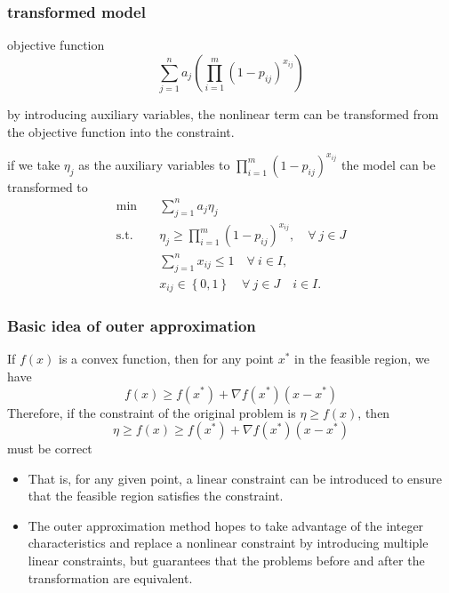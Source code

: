 \documentclass[CJK,10pt]{beamer}
\begin{document}
\begin{frame}
    \frametitle{transformed model}
    objective function
    \begin{equation*}
        \sum_{j=1}^n a_j \left( \prod_{i=1}^m (1 -  p_{ij})^{x_{ij}} \right)
    \end{equation*}
    {\footnotesize
    by introducing auxiliary variables, the nonlinear term can be transformed from the objective function into the constraint.
    
    if we take $\eta_j$ as the auxiliary variables to $\prod_{i=1}^m (1 -  p_{ij})^{x_{ij}}$ the model can be transformed to 
    \begin{align*} \tag{S0'}
        \min\quad & \sum_{j=1}^n a_j \eta_j \\ 
        \mathrm{s. t.}\quad & \eta_j \geq \prod_{i=1}^m (1 -  p_{ij})^{x_{ij}}, \quad \forall ~ j \in J \\ 
        &\sum_{j=1}^n x_{ij} \leq 1\quad \forall ~ i \in I,\\
        & x_{ij} \in \left\{ 0,1 \right\} \quad \forall ~ j\in J\quad i \in I.
    \end{align*}
    }
\end{frame}

\begin{frame}
    \frametitle{Basic idea of outer approximation}
    If $f(x)$ is a convex function, then for any point $x^*$ in the feasible region, we have
    \begin{equation*}
        f(x) \geq f(x^*) + \nabla f(x^*)(x - x^*)
    \end{equation*}
    Therefore, if the constraint of the original problem is $\eta \geq f(x)$, then
    \begin{equation*}
        \eta \geq f(x) \geq f(x^*) + \nabla f(x^*)(x - x^*)
    \end{equation*}
    must be correct
    \begin{itemize}
        \item That is, for any given point, a linear constraint can be introduced to ensure that the feasible region satisfies the constraint.
        \item The outer approximation method hopes to take advantage of the integer characteristics and replace a nonlinear constraint by introducing multiple linear constraints, but guarantees that the problems before and after the transformation are equivalent.
    \end{itemize}
    
    
\end{frame}
\end{document}
